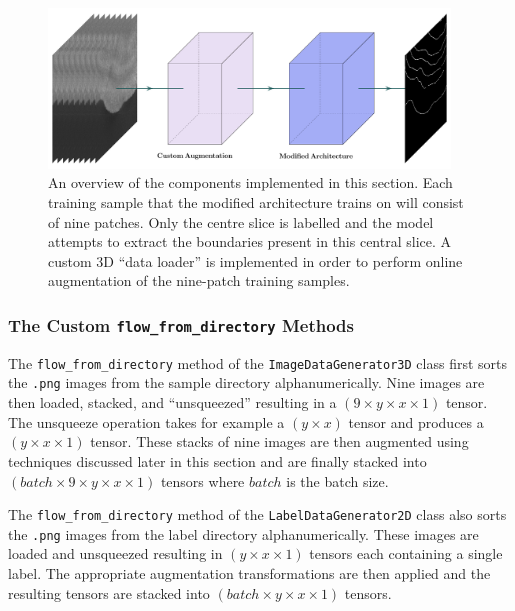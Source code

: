 \begin{figure}[t]
    \centering
    \includegraphics[width=0.95\textwidth]{images/3D-overview.pdf}
    \caption{An overview of the components implemented in this section. Each training sample that the modified architecture trains on will consist of nine patches. Only the centre slice is labelled and the model attempts to extract the boundaries present in this central slice. A custom 3D ``data loader'' is implemented in order to perform online augmentation of the nine-patch training samples.}
    \label{fig:3doverview}
\end{figure}

\subsubsection{The Custom \texttt{flow\_from\_directory} Methods}

The \texttt{flow\_from\_directory} method of the \texttt{ImageDataGenerator3D} class first sorts the \texttt{.png} images from the sample directory alphanumerically. Nine images are then loaded, stacked, and ``unsqueezed'' resulting in a $(9 \times y \times x \times 1)$ tensor. The unsqueeze operation takes for example a $(y \times x)$ tensor and produces a $(y \times x \times 1)$ tensor. These stacks of nine images are then augmented using techniques discussed later in this section and are finally stacked into $(batch \times 9 \times y \times x \times 1)$ tensors where $batch$ is the batch size.

The \texttt{flow\_from\_directory} method of the \texttt{LabelDataGenerator2D} class also sorts the \texttt{.png} images from the label directory alphanumerically. These images are loaded and unsqueezed resulting in $(y \times x \times 1)$ tensors each containing a single label. The appropriate augmentation transformations are then applied and the resulting tensors are stacked into $(batch \times y \times x \times 1)$ tensors.


